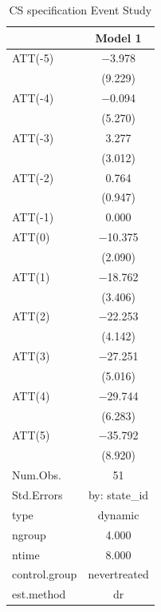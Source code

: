 \documentclass[
]{article}
\begin{document}
\begin{table}

\caption{\label{tab:table-4}CS specification Event Study}
\centering
\begin{tabular}[t]{lc}
\toprule
  & Model 1\\
\midrule
ATT(-5) & \num{-3.978}\\
 & (\num{9.229})\\
ATT(-4) & \num{-0.094}\\
 & (\num{5.270})\\
ATT(-3) & \num{3.277}\\
 & (\num{3.012})\\
ATT(-2) & \num{0.764}\\
 & (\num{0.947})\\
ATT(-1) & \num{0.000}\\
ATT(0) & \num{-10.375}\\
 & (\num{2.090})\\
ATT(1) & \num{-18.762}\\
 & (\num{3.406})\\
ATT(2) & \num{-22.253}\\
 & (\num{4.142})\\
ATT(3) & \num{-27.251}\\
 & (\num{5.016})\\
ATT(4) & \num{-29.744}\\
 & (\num{6.283})\\
ATT(5) & \num{-35.792}\\
 & (\num{8.920})\\
\midrule
Num.Obs. & \num{51}\\
Std.Errors & by: state\_id\\
type & dynamic\\
ngroup & \num{4.000}\\
ntime & \num{8.000}\\
control.group & nevertreated\\
est.method & dr\\
\bottomrule
\end{tabular}
\end{table}
\end{document}
